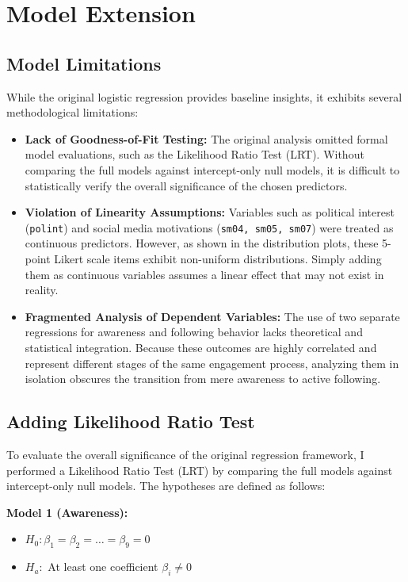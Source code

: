 \documentclass[12pt, a4paper]{article}
\begin{document}
	\section{Model Extension}
	
	\subsection{Model Limitations}
	While the original logistic regression provides baseline insights, it exhibits several methodological limitations:
	\begin{itemize}
		\item \textbf{Lack of Goodness-of-Fit Testing:} The original analysis omitted formal model evaluations, such as the Likelihood Ratio Test (LRT). Without comparing the full models against intercept-only null models, it is difficult to statistically verify the overall significance of the chosen predictors.
		\item \textbf{Violation of Linearity Assumptions:} Variables such as political interest (\texttt{polint}) and social media motivations (\texttt{sm04, sm05, sm07}) were treated as continuous predictors. However, as shown in the distribution plots, these 5-point Likert scale items exhibit non-uniform distributions. Simply adding them as continuous variables assumes a linear effect that may not exist in reality.
		\item \textbf{Fragmented Analysis of Dependent Variables:} The use of two separate regressions for awareness and following behavior lacks theoretical and statistical integration. Because these outcomes are highly correlated and represent different stages of the same engagement process, analyzing them in isolation obscures the transition from mere awareness to active following.
	\end{itemize}
	
	\subsection{Adding Likelihood Ratio Test}
	To evaluate the overall significance of the original regression framework, I performed a Likelihood Ratio Test (LRT) by comparing the full models against intercept-only null models. The hypotheses are defined as follows:
	
	\textbf{Model 1 (Awareness):}
	\begin{itemize}[itemsep=0em]
		\item $H_0: \beta_1 = \beta_2 = \dots = \beta_9 = 0$
		\item $H_a:$ At least one coefficient $\beta_i \neq 0$
	\end{itemize}
	
\end{document}
